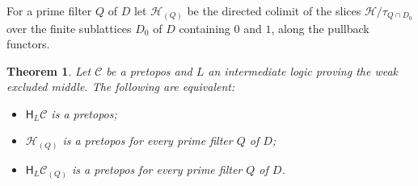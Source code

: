 \documentclass[11pt]{amsart}
\newtheorem{thm}{Theorem}[section]
\theoremstyle{definition}
\newcommand{\HH}{\mathsf H}
\newcommand{\cC}{\mathcal C}
\newcommand{\cH}{\mathcal H}
\begin{document}
For a prime filter $Q$ of $D$ let $\cH_{(Q)}$ be the directed colimit
of the slices $\cH/\tau_{Q\cap D_0}$ over the finite sublattices $D_0$
of $D$ containing $0$ and $1$, along the pullback functors.

\begin{thm}\label{thm:stalk}
Let $\cC$ be a pretopos and $L$ an intermediate logic proving the weak
excluded middle. The following are equivalent:
\begin{itemize}
\item[(i)] $\HH_L\cC$ is a pretopos;
\item[(ii)] $\cH_{(Q)}$ is a pretopos for every prime filter $Q$ of
$D$;
\item[(iii)] $\HH_L\cC_{(Q)}$ is a pretopos for every prime filter $Q$
of $D$.
\end{itemize}
\end{thm}
\end{document}

